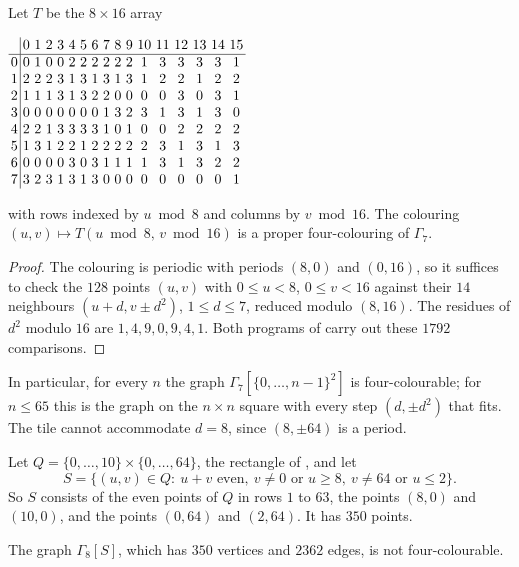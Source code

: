\documentclass[11pt,colorlinks]{charlie}
\begin{document}
\begin{proposition}\label{prop:tile}
Let $T$ be the $8\times16$ array
\begin{center}\small
$\setlength{\arraycolsep}{1.6pt}
\begin{array}{c|cccccccccccccccc}
 & 0&1&2&3&4&5&6&7&8&9&10&11&12&13&14&15\\\hline
0& 0&1&0&0&2&2&2&2&2&2&1&3&3&3&3&1\\
1& 2&2&2&3&1&3&1&3&1&3&1&2&2&1&2&2\\
2& 1&1&1&3&1&3&2&2&0&0&0&0&3&0&3&1\\
3& 0&0&0&0&0&0&0&1&3&2&3&1&3&1&3&0\\
4& 2&2&1&3&3&3&3&1&0&1&0&0&2&2&2&2\\
5& 1&3&1&2&2&1&2&2&2&2&2&3&1&3&1&3\\
6& 0&0&0&0&3&0&3&1&1&1&1&3&1&3&2&2\\
7& 3&2&3&1&3&1&3&0&0&0&0&0&0&0&0&1
\end{array}$
\end{center}
with rows indexed by $u\bmod8$ and columns by $v\bmod16$. The colouring $(u,v)\mapsto T(u\bmod8,\,v\bmod16)$ is a proper four-colouring of $\Gamma_7$.
\end{proposition}

\begin{proof}
The colouring is periodic with periods $(8,0)$ and $(0,16)$, so it suffices to check the $128$ points $(u,v)$ with $0\le u<8$, $0\le v<16$ against their $14$ neighbours $(u+d,v\pm d^2)$, $1\le d\le7$, reduced modulo $(8,16)$. The residues of $d^2$ modulo $16$ are $1,4,9,0,9,4,1$. Both programs of  carry out these $1792$ comparisons.
\end{proof}

In particular, for every $n$ the graph $\Gamma_7[\{0,\dots,n-1\}^2]$ is four-colourable; for $n\le65$ this is the graph on the $n\times n$ square with every step $(d,\pm d^2)$ that fits. The tile cannot accommodate $d=8$, since $(8,\pm64)$ is a period.

Let $Q=\{0,\dots,10\}\times\{0,\dots,64\}$, the rectangle of \cite[Lemma~4.1]{KGRW}, and let
\[
S=\{(u,v)\in Q:\ u+v\text{ even},\ v\ne0\text{ or }u\ge8,\ v\ne64\text{ or }u\le2\}.
\]
So $S$ consists of the even points of $Q$ in rows $1$ to $63$, the points $(8,0)$ and $(10,0)$, and the points $(0,64)$ and $(2,64)$. It has $350$ points.

\begin{proposition}\label{prop:crop}
The graph $\Gamma_8[S]$, which has $350$ vertices and $2362$ edges, is not four-colourable.
\end{proposition}
\end{document}
